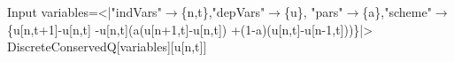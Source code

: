 \begin{mmaCell}[moredefined={variables, expression, DiscreteConservedQ}]{Input}
  variables=<|"indVars"\(\pmb{\to}\)\{n,t\},"depVars"\(\pmb{\to}\)\{u\},
  "pars"\(\pmb{\to}\)\{a\},"scheme"\(\pmb{\to}\)\{u[n,t+1]-u[n,t]
  -u[n,t](a(u[n+1,t]-u[n,t])
  +(1-a)(u[n,t]-u[n-1,t]))\}|>
  DiscreteConservedQ[variables][u[n,t]]
  
\end{mmaCell}